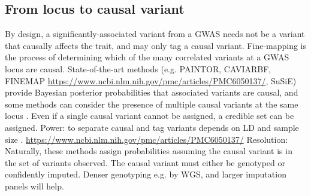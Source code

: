 \begin{outline}
%

\subsection{From locus to causal variant}

\1 By design, a significantly-associated variant from a \gls{GWAS} needs not be a variant that causally affects the trait, and may only tag a causal variant.
    \2 Fine-mapping is the process of determining which of the many correlated variants at a \gls{GWAS} locus are causal.
    \2 State-of-the-art methods (e.g. PAINTOR, CAVIARBF, FINEMAP \url{https://www.ncbi.nlm.nih.gov/pmc/articles/PMC6050137/}, SuSiE) provide Bayesian posterior probabilities that associated variants are causal, and some methods can consider the presence of multiple causal variants at the same locus \autocite{schaid2018GenomewideAssociationsCandidate}.
    \2 Even if a single causal variant cannot be assigned, a credible set can be assigned.
    \2 Power: to separate causal and tag variants depends on \gls{LD} and sample size \autocite{visscher201710YearsGWAS}. \url{https://www.ncbi.nlm.nih.gov/pmc/articles/PMC6050137/}
    \2 Resolution: Naturally, these methods assign probabilities assuming the causal variant is in the set of variants observed.
        \3 The causal variant must either be genotyped or confidently imputed. Denser genotyping e.g. by WGS, and larger imputation panels will help.


\end{outline}
